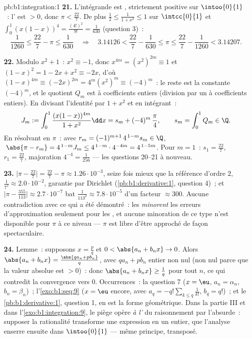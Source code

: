\begin{solution}{pb:b1:integration:1}
\textbf{21.} L'intégrande est , strictement positive sur
$\intoo{0}{1}$~: l' est $> 0$, donc $\pi < \frac{22}{7}$.
De plus $\frac12 \leq \frac{1}{1+x^2} \leq 1$ sur
$\intcc{0}{1}$ et $\int_0^1 (x(1-x))^4 = \frac{(4!)^2}{9!} =
\frac{1}{630}$ (question 3)~:
\[
\frac{1}{1260} \leq \frac{22}{7} - \pi \leq \frac{1}{630}
\quad\Longrightarrow\quad
3.14126 < \frac{22}{7} - \frac{1}{630} \leq \pi \leq
\frac{22}{7} - \frac{1}{1260} < 3.14207 .
\]

\textbf{22.} Modulo $x^2 + 1$~: $x^2 \equiv -1$, donc $x^{4m} =
(x^2)^{2m} \equiv 1$ et $(1 - x)^2 = 1 - 2x + x^2 \equiv -2x$,
d'où $(1-x)^{4m} \equiv (-2x)^{2m} = 4^m (x^2)^m \equiv
(-4)^m$~: le reste est la constante $(-4)^m$, et le quotient $Q_m$
est à coefficients entiers (division par un  à
coefficients entiers). En divisant l'identité par $1 + x^2$ et en
intégrant~:
\[
J_m := \int_0^1 \frac{(x(1-x))^{4m}}{1+x^2}\dd x
= s_m + (-4)^m\,\frac{\pi}{4},
\qquad s_m = \int_0^1 Q_m \in \Q .
\]
En résolvant en $\pi$~: avec $r_m = (-1)^{m+1}\,4^{\,1-m} s_m \in
\Q$, $\;\abs{\pi - r_m} = 4^{\,1-m} J_m \leq
4^{\,1-m}\cdot4^{-4m} = 4^{\,1-5m}$. Pour $m = 1$~: $s_1 =
\frac{22}{7}$, $r_1 = \frac{22}{7}$, majoration $4^{-4} =
\frac{1}{256}$ --- les questions 20--21 à nouveau.

\textbf{23.} $\bigl|\pi - \frac{22}{7}\bigr| = \frac{22}{7} -
\pi \approx 1.26\cdot10^{-3}$, seize fois mieux que la référence
d'ordre $2$, $\frac{1}{7^2} \approx 2.0\cdot10^{-2}$, garantie par
Dirichlet (\cref{pb:b1:derivative:1}, question 4)~;
et $\bigl|\pi - \frac{355}{113}\bigr| \approx 2.7\cdot10^{-7}$
bat $\frac{1}{113^2} \approx 7.8\cdot10^{-5}$ d'un facteur
$\approx 300$. Aucune contradiction avec ce qui a été démontré~: les
 \emph{minorent} les erreurs d'approximation
seulement pour les , et aucune minoration de ce
type n'est disponible pour $\pi$ à ce niveau --- $\pi$ est libre
d'être approché de façon spectaculaire.

\textbf{24.} Lemme~: supposons $x = \frac pq$ et $0 < \abs{a_n +
b_n x} \to 0$. Alors $\abs{a_n + b_n x} = \frac{\abs{q a_n + p
b_n}}{q}$, avec $q a_n + p b_n$ entier non nul (non nul parce que
la valeur absolue est $> 0$)~: donc $\abs{a_n + b_n x}
\geq \frac1q$ pour tout $n$, ce qui contredit la convergence vers
$0$. Occurrences~: la question 7 ($x = \eu$, $a_n = \alpha_n$, $b_n =
\beta_n$)~; l'\cref{exo:b1:seq:9} ($x = \eu$ encore, avec $a_q =
-q!\sum_{k \leq q}\frac{1}{k!}$, $b_q = q!$)~; et le
\cref{pb:b1:derivative:1}, question 1, en est la forme géométrique.
Dans la partie III et dans l'\cref{exo:b1:integration:9}, le piège
opère \emph{à l'} du raisonnement par l'absurde~: supposer
la rationalité transforme une expression en un entier, que l'analyse
enserre ensuite dans $\intoo{0}{1}$ --- même principe, transposé.


\end{solution}
